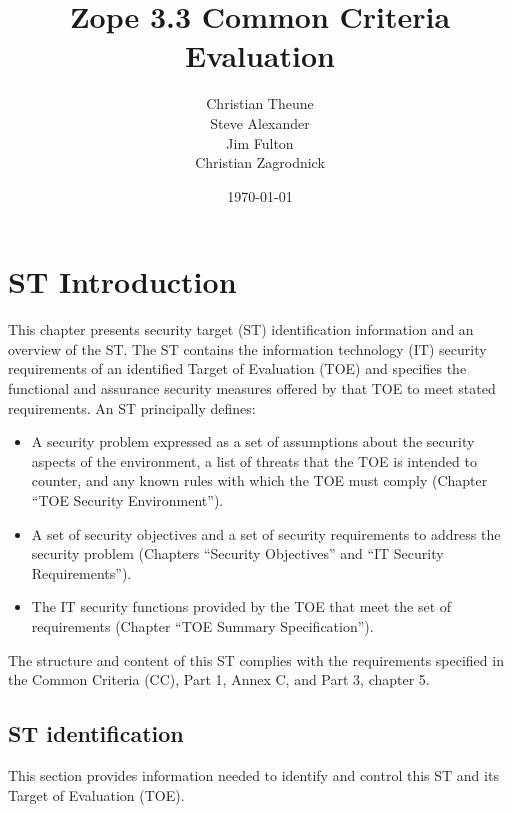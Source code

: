 \documentclass[12pt,english]{scrbook}
\title{Zope 3.3 Common Criteria Evaluation}
\author{Christian Theune \\
  Steve Alexander \\
  Jim Fulton \\
  Christian Zagrodnick}
\date{\today}
\begin{document}
\maketitle
\tableofcontents
\newpage
\listoftables

\chapter{ST Introduction}

This chapter presents security target (ST) identification information and an
overview of the ST. The ST contains the information technology (IT) security
requirements of an identified Target of Evaluation (TOE) and specifies the
functional and assurance security measures offered by that TOE to meet stated
requirements. An ST principally defines:

\begin{itemize}
    \item A security problem expressed as a set of assumptions about the
    security aspects of the environment, a list of threats that the TOE is
    intended to counter, and any known rules with which the TOE must comply
    (Chapter ``TOE Security Environment'').

    \item A set of security objectives and a set of security requirements to
    address the security problem (Chapters ``Security Objectives'' and ``IT
    Security Requirements'').

    \item The IT security functions provided by the TOE that meet the set of
    requirements (Chapter ``TOE Summary Specification'').
\end{itemize}

The structure and content of this ST complies with the requirements specified
in the Common Criteria (CC), Part 1, Annex C, and Part 3, chapter 5.

\section{ST identification}

This section provides information needed to identify and control this ST and
its Target of Evaluation (TOE).
\end{document}
